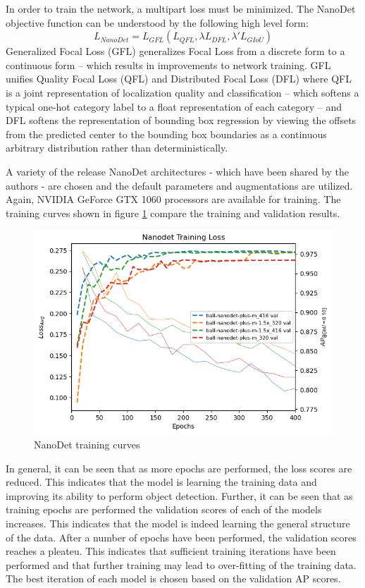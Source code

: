 \documentclass[a4paper,twoside,12pt]{report}
\begin{document}
In order to train the network, a multipart loss must be minimized. The NanoDet objective function can be understood by the following high level form:
\begin{equation}
L_{NanoDet} =  L_{GFL}(L_{QFL}, \lambda L_{DFL}, \lambda' L_{GIoU})
\end{equation} 
Generalized Focal Loss (GFL) \citep{gflloss} generalizes Focal Loss from a discrete form to a continuous form -- which results in improvements to network training. GFL unifies Quality Focal Loss (QFL) and Distributed Focal Loss (DFL) where QFL is a joint representation of localization quality and classification -- which softens a typical one-hot category label to a float representation of each category -- and DFL softens the representation of bounding box regression by viewing the offsets from the predicted center to the bounding box boundaries as a continuous arbitrary distribution rather than deterministically.

A variety of the release NanoDet architectures - which have been shared by the authors - are chosen and the default parameters and augmentations are utilized. Again, NVIDIA GeForce GTX 1060 processors are available for training. The training curves shown in figure \ref{fig:nanodet_train} compare the training and validation results.

\begin{figure}[h!]
\begin{center}
\includegraphics[width=13cm]{images/nanodet_train.png}
\caption{NanoDet training curves}
\label{fig:nanodet_train}
\end{center}
\end{figure}

In general, it can be seen that as more epochs are performed, the loss scores are reduced. This indicates that the model is learning the training data and improving its ability to perform object detection. Further, it can be seen that as training epochs are performed the validation scores of each of the models increases. This indicates that the model is indeed learning the general structure of the data. After a number of epochs have been performed, the validation scores reaches a pleateu. This indicates that sufficient training iterations have been performed and that further training may lead to over-fitting of the training data. The best iteration of each model is chosen based on the validation AP scores. 
\end{document}
